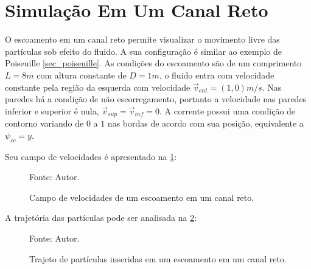 \section{\textbf{Simulação Em Um Canal Reto}}
\label{sec_channel}
O escoamento em um canal reto permite visualizar o movimento livre das partículas sob efeito do fluido.
A sua configuração é similar ao exemplo de Poiseuille \ref{sec_poiseuille}.
As condições do escoamento são de um comprimento $L=8m$ com altura constante de $D=1m$, o fluido entra com velocidade constante pela região da esquerda com velocidade $\vec{v}_{ent}=(1, 0)m/s$.
Nas paredes há a condição de não escorregamento, portanto a velocidade nas paredes inferior e superior é nula, $\vec{v}_{sup}=\vec{v}_{inf}=0$.
A corrente possui uma condição de contorno variando de $0$ a $1$ nas bordas de acordo com sua posição, equivalente a $\psi_{cc}=y$.

Seu campo de velocidades é apresentado na \ref{channel_result}:
\begin{figure}[H]
    \centering
     {\raggedleft \scriptsize Fonte: Autor.}
    \caption{Campo de velocidades de um escoamento em um canal reto.}
    \label{channel_result}
\end{figure}

A trajetória das partículas pode ser analisada na \ref{channel_trajectory}:
\begin{figure}[H]
    \centering
     {\raggedleft \scriptsize Fonte: Autor.}
    \caption{Trajeto de partículas inseridas em um escoamento em um canal reto.}
    \label{channel_trajectory}
\end{figure}


